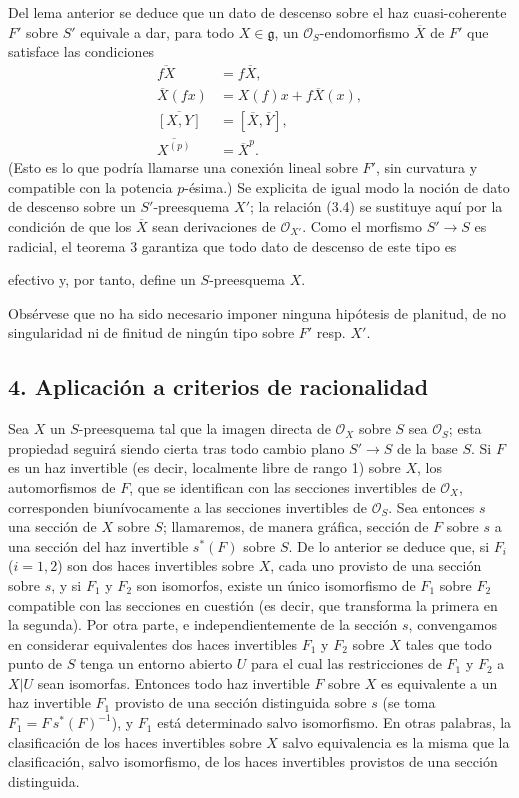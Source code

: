 Del lema anterior se deduce que un dato de descenso sobre el haz
cuasi-coherente $F'$ sobre $S'$ equivale a dar, para todo $X\in\mathfrak g$, un
$\mathcal O_S$-endomorfismo $\overline X$ de $F'$ que satisface las condiciones
\begin{align}
  \overline{fX}&=f\overline X, \tag{3.7}\\
  \overline X(fx)&=X(f)x+f\overline X(x), \tag{3.8}\\
  \overline{[X,Y]}&=[\overline X,\overline Y], \tag{3.9}\\
  \overline{X^{(p)}}&=\overline X^p. \tag{3.10}
\end{align}
(Esto es lo que podría llamarse una conexión lineal sobre $F'$, sin curvatura
y compatible con la potencia $p$-ésima.) Se explicita de igual modo la noción
de dato de descenso sobre un $S'$-preesquema $X'$; la relación (3.4) se
sustituye aquí por la condición de que los $\overline X$ sean derivaciones de
$\mathcal O_{X'}$. Como el morfismo $S'\longrightarrow S$ es radicial, el
teorema 3 garantiza que todo dato de descenso de este tipo es

efectivo y, por tanto, define un $S$-preesquema $X$.

Obsérvese que no ha sido necesario imponer ninguna hipótesis de planitud, de no
singularidad ni de finitud de ningún tipo sobre $F'$ resp. $X'$.

\subsection*{4. Aplicación a criterios de racionalidad}

Sea $X$ un $S$-preesquema tal que la imagen directa de $\mathcal O_X$ sobre
$S$ sea $\mathcal O_S$; esta propiedad seguirá siendo cierta tras todo cambio
plano $S'\longrightarrow S$ de la base $S$. Si $F$ es un haz invertible (es
decir, localmente libre de rango 1) sobre $X$, los automorfismos de $F$, que se
identifican con las secciones invertibles de $\mathcal O_X$, corresponden
biunívocamente a las secciones invertibles de $\mathcal O_S$. Sea entonces $s$
una sección de $X$ sobre $S$; llamaremos, de manera gráfica, sección de $F$
sobre $s$ a una sección del haz invertible $s^*(F)$ sobre $S$. De lo anterior
se deduce que, si $F_i$ ($i=1,2$) son dos haces invertibles sobre $X$, cada uno
provisto de una sección sobre $s$, y si $F_1$ y $F_2$ son isomorfos, existe un
único isomorfismo de $F_1$ sobre $F_2$ compatible con las secciones en cuestión
(es decir, que transforma la primera en la segunda). Por otra parte, e
independientemente de la sección $s$, convengamos en considerar equivalentes
dos haces invertibles $F_1$ y $F_2$ sobre $X$ tales que todo punto de $S$ tenga
un entorno abierto $U$ para el cual las restricciones de $F_1$ y $F_2$ a
$X|U$ sean isomorfas. Entonces todo haz invertible $F$ sobre $X$ es equivalente
a un haz invertible $F_1$ provisto de una sección distinguida sobre $s$ (se
toma $F_1=F\,s^*(F)^{-1}$), y $F_1$ está determinado salvo isomorfismo. En
otras palabras, la clasificación de los haces invertibles sobre $X$ salvo
equivalencia es la misma que la clasificación, salvo isomorfismo, de los haces
invertibles provistos de una sección distinguida.

